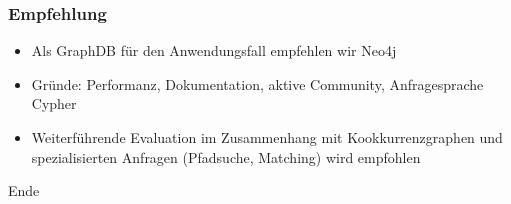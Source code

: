 \documentclass{beamer}
\begin{document}
\begin{frame}\frametitle{Empfehlung}
	\begin{itemize}
		\item Als GraphDB für den Anwendungsfall empfehlen wir Neo4j
		\item Gründe: Performanz, Dokumentation, aktive Community, Anfragesprache Cypher
		\item Weiterführende Evaluation im Zusammenhang mit Kookkurrenzgraphen und spezialisierten Anfragen (Pfadsuche, Matching) wird empfohlen
	\end{itemize} 
\end{frame}

\begin{frame}
	\begin{center}
		\begin{Huge}
			Ende
		\end{Huge}
	\end{center}
\end{frame}
\end{document}
